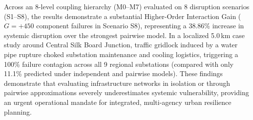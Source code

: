 \documentclass[oneside]{ieeeaccess}
\begin{document}
Across an 8-level coupling hierarchy (M0--M7) evaluated on 8 disruption scenarios (S1--S8), the results demonstrate a substantial Higher-Order Interaction Gain ($G = +450$ component failures in Scenario S8), representing a 38.86\% increase in systemic disruption over the strongest pairwise model. In a localized 5.0\,km case study around Central Silk Board Junction, traffic gridlock induced by a water pipe rupture choked substation maintenance and cooling logistics, triggering a 100\% failure contagion across all 9 regional substations (compared with only 11.1\% predicted under independent and pairwise models). These findings demonstrate that evaluating infrastructure networks in isolation or through pairwise approximations severely underestimates systemic vulnerability, providing an urgent operational mandate for integrated, multi-agency urban resilience planning.
\end{document}
